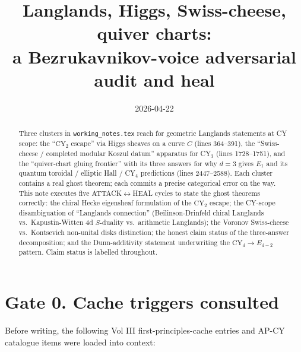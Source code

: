 \documentclass[11pt]{amsart}
\title{Langlands, Higgs, Swiss-cheese, quiver charts:\\
a Bezrukavnikov-voice adversarial audit and heal}
\author{}
\date{2026-04-22}
\theoremstyle{definition}
\providecommand{\CY}{\mathrm{CY}}
\providecommand{\Eone}{E_1}
\begin{document}
\maketitle

\begin{abstract}
Three clusters in \texttt{working\_notes.tex} reach for geometric
Langlands statements at CY scope: the ``$\CY_2$ escape'' via Higgs
sheaves on a curve $C$ (lines 364--391), the ``Swiss-cheese / completed
modular Koszul datum'' apparatus for CY$_3$ (lines 1728--1751), and the
``quiver-chart gluing frontier'' with its three answers for why
$d = 3$ gives $\Eone$ and its quantum toroidal / elliptic Hall / CY$_4$
predictions (lines 2447--2588). Each cluster contains a real ghost
theorem; each commits a precise categorical error on the way. This
note executes five ATTACK$\leftrightarrow$HEAL cycles to state the
ghost theorems correctly: the chiral Hecke eigensheaf formulation of
the $\CY_2$ escape; the CY-scope disambiguation of ``Langlands
connection'' (Beilinson-Drinfeld chiral Langlands vs.~Kapustin-Witten
4d $S$-duality vs.~arithmetic Langlands); the Voronov Swiss-cheese
vs.~Kontsevich non-unital disks distinction; the honest claim status
of the three-answer decomposition; and the Dunn-additivity statement
underwriting the $\CY_d \to E_{d-2}$ pattern. Claim status is labelled
throughout.
\end{abstract}

\section*{Gate 0. Cache triggers consulted}

Before writing, the following Vol III first-principles-cache entries
and AP-CY catalogue items were loaded into context:
\end{document}
